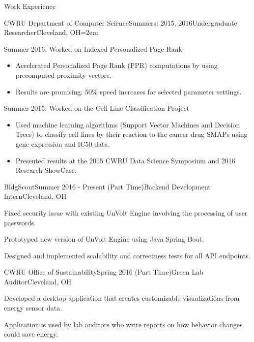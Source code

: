 \documentclass{resume} %
\begin{document}
\begin{rSection}{Work Experience}

\begin{rSubsection}{CWRU Department of Computer Science}{Summers: 2015, 2016}{Undergraduate Researcher}{Cleveland, OH}{\leftmargin=2em}

\item Summer 2016: Worked on Indexed Personalized Page Rank
{\renewcommand\labelitemi{$\cdot$}\vspace{-0.5em}
\begin{itemize}
\item Accelerated Personalized Page Rank (PPR) computations by using precomputed proximity vectors.
\vspace{-0.5em}  
\item Results are promising: 50\% speed increases for selected parameter settings.
\end{itemize}
}

\item Summer 2015: Worked on the Cell Line Classification Project
{\renewcommand\labelitemi{$\cdot$}\vspace{-0.5em}
\begin{itemize}
\item Used machine learning algorithms (Support Vector Machines and Decision Trees) to classify cell lines by their reaction to the cancer drug SMAPs using gene expression and IC50 data.
\vspace{-0.5em}  
\item Presented results at the 2015 CWRU Data Science Symposium and 2016 Research ShowCase.
\end{itemize}
}
\end{rSubsection}


\begin{rSubsection}{BldgScout}{Summer 2016 - Present (Part Time)}{Backend Development Intern}{Cleveland, OH}
\item Fixed security issue with existing UnVolt Engine involving the processing of user passwords.
\item Prototyped new version of UnVolt Engine using Java Spring Boot.
\item Designed and implemented scalability and correctness tests for all API endpoints.

\end{rSubsection}

\begin{rSubsection}{CWRU Office of Sustainability}{Spring 2016 (Part Time)}{Green Lab Auditor}{Cleveland, OH}
\item Developed a desktop application that creates customizable visualizations from energy sensor data.
\item Application is used by lab auditors who write reports on how behavior changes could save energy.
\end{rSubsection}


\end{rSection}
\end{document}
